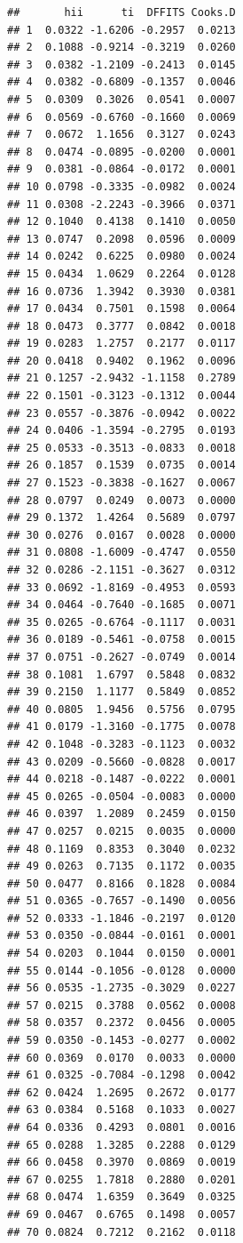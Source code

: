 \documentclass[
]{book}
\begin{document}
\begin{verbatim}
##       hii      ti  DFFITS Cooks.D
## 1  0.0322 -1.6206 -0.2957  0.0213
## 2  0.1088 -0.9214 -0.3219  0.0260
## 3  0.0382 -1.2109 -0.2413  0.0145
## 4  0.0382 -0.6809 -0.1357  0.0046
## 5  0.0309  0.3026  0.0541  0.0007
## 6  0.0569 -0.6760 -0.1660  0.0069
## 7  0.0672  1.1656  0.3127  0.0243
## 8  0.0474 -0.0895 -0.0200  0.0001
## 9  0.0381 -0.0864 -0.0172  0.0001
## 10 0.0798 -0.3335 -0.0982  0.0024
## 11 0.0308 -2.2243 -0.3966  0.0371
## 12 0.1040  0.4138  0.1410  0.0050
## 13 0.0747  0.2098  0.0596  0.0009
## 14 0.0242  0.6225  0.0980  0.0024
## 15 0.0434  1.0629  0.2264  0.0128
## 16 0.0736  1.3942  0.3930  0.0381
## 17 0.0434  0.7501  0.1598  0.0064
## 18 0.0473  0.3777  0.0842  0.0018
## 19 0.0283  1.2757  0.2177  0.0117
## 20 0.0418  0.9402  0.1962  0.0096
## 21 0.1257 -2.9432 -1.1158  0.2789
## 22 0.1501 -0.3123 -0.1312  0.0044
## 23 0.0557 -0.3876 -0.0942  0.0022
## 24 0.0406 -1.3594 -0.2795  0.0193
## 25 0.0533 -0.3513 -0.0833  0.0018
## 26 0.1857  0.1539  0.0735  0.0014
## 27 0.1523 -0.3838 -0.1627  0.0067
## 28 0.0797  0.0249  0.0073  0.0000
## 29 0.1372  1.4264  0.5689  0.0797
## 30 0.0276  0.0167  0.0028  0.0000
## 31 0.0808 -1.6009 -0.4747  0.0550
## 32 0.0286 -2.1151 -0.3627  0.0312
## 33 0.0692 -1.8169 -0.4953  0.0593
## 34 0.0464 -0.7640 -0.1685  0.0071
## 35 0.0265 -0.6764 -0.1117  0.0031
## 36 0.0189 -0.5461 -0.0758  0.0015
## 37 0.0751 -0.2627 -0.0749  0.0014
## 38 0.1081  1.6797  0.5848  0.0832
## 39 0.2150  1.1177  0.5849  0.0852
## 40 0.0805  1.9456  0.5756  0.0795
## 41 0.0179 -1.3160 -0.1775  0.0078
## 42 0.1048 -0.3283 -0.1123  0.0032
## 43 0.0209 -0.5660 -0.0828  0.0017
## 44 0.0218 -0.1487 -0.0222  0.0001
## 45 0.0265 -0.0504 -0.0083  0.0000
## 46 0.0397  1.2089  0.2459  0.0150
## 47 0.0257  0.0215  0.0035  0.0000
## 48 0.1169  0.8353  0.3040  0.0232
## 49 0.0263  0.7135  0.1172  0.0035
## 50 0.0477  0.8166  0.1828  0.0084
## 51 0.0365 -0.7657 -0.1490  0.0056
## 52 0.0333 -1.1846 -0.2197  0.0120
## 53 0.0350 -0.0844 -0.0161  0.0001
## 54 0.0203  0.1044  0.0150  0.0001
## 55 0.0144 -0.1056 -0.0128  0.0000
## 56 0.0535 -1.2735 -0.3029  0.0227
## 57 0.0215  0.3788  0.0562  0.0008
## 58 0.0357  0.2372  0.0456  0.0005
## 59 0.0350 -0.1453 -0.0277  0.0002
## 60 0.0369  0.0170  0.0033  0.0000
## 61 0.0325 -0.7084 -0.1298  0.0042
## 62 0.0424  1.2695  0.2672  0.0177
## 63 0.0384  0.5168  0.1033  0.0027
## 64 0.0336  0.4293  0.0801  0.0016
## 65 0.0288  1.3285  0.2288  0.0129
## 66 0.0458  0.3970  0.0869  0.0019
## 67 0.0255  1.7818  0.2880  0.0201
## 68 0.0474  1.6359  0.3649  0.0325
## 69 0.0467  0.6765  0.1498  0.0057
## 70 0.0824  0.7212  0.2162  0.0118
\end{verbatim}
\end{document}
